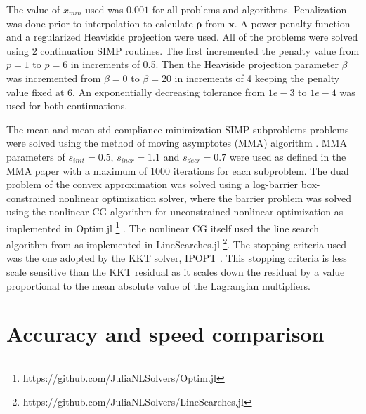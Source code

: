    The value of $x_{min}$ used was $0.001$ for all problems and algorithms. Penalization was done prior to interpolation to calculate $\bm{\rho}$ from $\bm{x}$. A power penalty function and a regularized Heaviside projection were used. All of the problems were solved using 2 continuation SIMP routines. The first incremented the penalty value from $p = 1$ to $p = 6$ in increments of 0.5. Then the Heaviside projection parameter $\beta$ was incremented from $\beta = 0$ to $\beta = 20$ in increments of 4 keeping the penalty value fixed at 6. An exponentially decreasing tolerance from $1e-3$ to $1e-4$ was used for both continuations. 

    The mean and mean-std compliance minimization SIMP subproblems problems were solved using the method of moving asymptotes (MMA) algorithm \citep{Svanberg1987}. MMA parameters of $s_{init} = 0.5$, $s_{incr} = 1.1$ and $s_{decr} = 0.7$ were used as defined in the MMA paper with a maximum of 1000 iterations for each subproblem. The dual problem of the convex approximation was solved using a log-barrier box-constrained nonlinear optimization solver, where the barrier problem was solved using the nonlinear CG algorithm for unconstrained nonlinear optimization \citep{Nocedal2006} as implemented in Optim.jl \footnote{https://github.com/JuliaNLSolvers/Optim.jl} \citep{KMogensen2018}. The nonlinear CG itself used the line search algorithm from \cite{Hager2006} as implemented in LineSearches.jl \footnote{https://github.com/JuliaNLSolvers/LineSearches.jl}. The stopping criteria used was the one adopted by the KKT solver, IPOPT \citep{Wachter2006}. This stopping criteria is less scale sensitive than the KKT residual as it scales down the residual by a value proportional to the mean absolute value of the Lagrangian multipliers.

\section{Accuracy and speed comparison}

